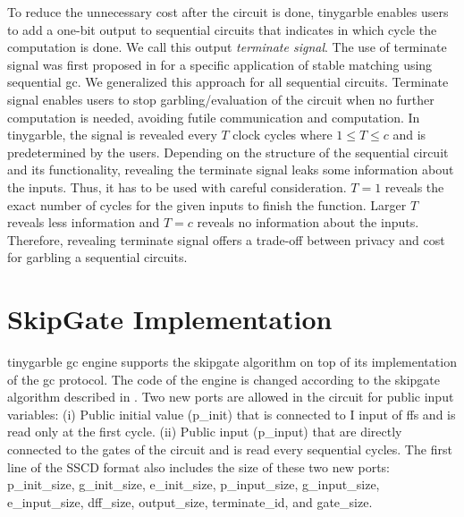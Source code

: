 To reduce the unnecessary cost after the circuit is done, \gls{tinygarble} enables users to add a one-bit output to sequential circuits that indicates in which cycle the computation is done.
We call this output \textit{terminate signal}.
The use of terminate signal was first proposed in \cite{riazi2017toward} for a specific application of stable matching using sequential \acrshort{gc}.
We generalized this approach for all sequential circuits.
Terminate signal enables users to stop garbling/evaluation of the circuit when no further computation is needed, avoiding futile communication and computation.
In \gls{tinygarble}, the signal is revealed every $T$ clock cycles where $1 \le T \le c$ and is predetermined by the users.
Depending on the structure of the sequential circuit and its functionality, revealing the terminate signal leaks some information about the inputs.
Thus, it has to be used with careful consideration.
$T=1$ reveals the exact number of cycles for the given inputs to finish the function.
Larger $T$ reveals less information and $T=c$ reveals no information about the inputs.
Therefore, revealing terminate signal offers a trade-off between privacy and cost for garbling a sequential circuits.

\section{SkipGate Implementation}\label{sec:engine-skipgate}
\gls{tinygarble} \acrshort{gc} engine supports the \gls{skipgate} algorithm on top of its implementation of the \acrshort{gc} protocol.
The code of the engine is changed according to the \gls{skipgate} algorithm described in .
Two new ports are allowed in the circuit for public input variables: (i) Public initial value (p\_init) that is connected to I input of \acrshort{ff}s and is read only at the first cycle. (ii) Public input (p\_input) that are directly connected to the gates of the circuit and is read every sequential cycles.
The first line of the SSCD format also includes the size of these two new ports: p\_init\_size,  g\_init\_size, e\_init\_size, p\_input\_size, g\_input\_size, e\_input\_size, dff\_size, output\_size, terminate\_id, and gate\_size.
